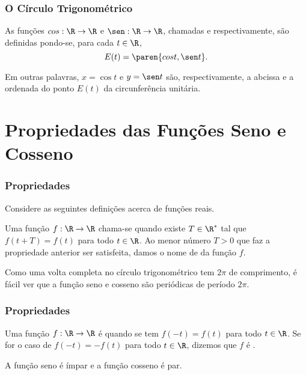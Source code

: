 \documentclass[brazil, notheorems, 10pt]{beamer}
\begin{document}

\begin{frame}
\frametitle{O Círculo Trigonométrico} %

\begin{definicao}
As funções $\cos : \R \to \R$ e $\sen : \R \to \R$, chamadas
 e  respectivamente, são
definidas pondo-se, para cada $t \in \R$,
$$E(t) = \paren{\cos t , \sen t}.$$
\end{definicao}
Em outras palavras, $x= \cos t$ e $y = \sen t$ são, respectivamente,
a abcissa e a ordenada do ponto $E(t)$ da circunferência unitária.

\end{frame}



\section{Propriedades das Funções Seno e Cosseno}
\begin{frame}
\frametitle{Propriedades} %


Considere as seguintes definições acerca de funções reais.

\begin{definicao}
Uma função $f: \R \to \R$ chama-se  quando existe $T
\in \R^\ast$ tal que $f(t + T) = f(t)$ para todo $t \in \R$. Ao
menor número $T>0$ que faz a propriedade anterior ser satisfeita,
damos o nome de  da função $f$.
\end{definicao}\pause
Como uma volta completa no círculo trigonométrico tem $2 \pi$ de
comprimento, é fácil ver que a função seno e cosseno são periódicas
de período $2\pi$.
\end{frame}

\begin{frame}
\frametitle{Propriedades} %

\begin{definicao}
Uma função $f: \R \to \R$ é  quando se tem $f(-t) = f(t)$
para todo $t\in \R$. Se for o caso de $f(-t) = - f(t)$ para todo $t
\in \R$, dizemos que $f$ é .
\end{definicao}\pause

\begin{proposicao}
A função seno é ímpar e a função cosseno é par.
\end{proposicao}


\end{frame}
\end{document}
